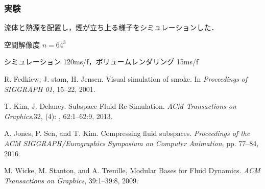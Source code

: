 \documentclass[aspectratio=169,dvipdfmx,hyperref={bookmarks=true}]{beamer}
\begin{document}
 \begin{frame}
 \frametitle{実験}
流体と熱源を配置し，煙が立ち上る様子をシミュレーションした．

空間解像度 $n = 64^3$

シミュレーション 120ms/f，ボリュームレンダリング 15ms/f
  \end{frame}
\begin{thebibliography}{99}
\beamertemplatetextbibitems

R. Fedkiew, J. stam, H. Jensen. Visual simulation of smoke. In \textit{Proceedings of SIGGRAPH 01}, 15--22, 2001.

T. Kim, J. Delaney. Subspace Fluid Re-Simulation. \textit{ACM Transactions on Graphics},32, (4): , 62:1--62:9, 2013.

A. Jones, P. Sen, and T. Kim. Compressing fluid subspaces. \textit{Proceedings of the ACM SIGGRAPH/Eurographics Symposium on Computer Animation}, pp. 77--84, 2016.

M. Wicke, M. Stanton, and A. Treuille, Modular Bases for Fluid Dynamics. \textit{ACM Transactions on Graphics}, 39:1--39:8, 2009.


\end{thebibliography}
\end{document}
